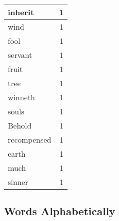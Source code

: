 \begin{center}
\begin{longtable}{l|r}
inherit & 1\\ \hline 
wind & 1\\ \hline 
fool & 1\\ \hline 
servant & 1\\ \hline 
fruit & 1\\ \hline 
tree & 1\\ \hline 
winneth & 1\\ \hline 
souls & 1\\ \hline 
Behold & 1\\ \hline 
recompensed & 1\\ \hline 
earth & 1\\ \hline 
much & 1\\ \hline 
sinner & 1\\ \hline 
\end{longtable}  
\end{center}  


  
\normalsize  

  
  


\subsection{Words Alphabetically}


